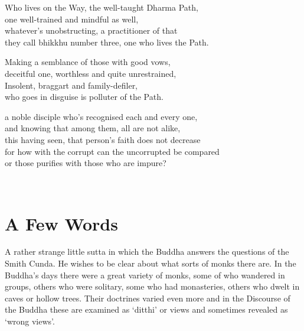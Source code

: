 \begin{MyDescription}{}
Who lives on the Way, the well-taught Dharma Path,\\
one well-trained and mindful as well,\\
whatever's unobstructing, a practitioner of that\\
they call bhikkhu number three, one who lives the Path.
\end{MyDescription}
   
\begin{MyDescription}{}
Making a semblance of those with good vows,\\
deceitful one, worthless and quite unrestrained,\\
Insolent, braggart and family-defiler,\\
who goes in disguise is polluter of the Path.
\end{MyDescription}
   
\begin{MyDescription}{}
a noble disciple who's recognised each and every one,\\
and knowing that among them, all are not alike,\\
this having seen, that person's faith does not decrease\\
for how with the corrupt can the uncorrupted be compared\\
or those purifies with those who are impure?
\end{MyDescription}
   
\begin{MyDescription}[(Sn. 83-90)]{}
\end{MyDescription}
   							
\newpage    
\section{A Few Words}
   
A rather strange little sutta in which the Buddha answers the questions of the Smith Cunda. He wishes to be clear about what sorts of monks there are. In the Buddha's days there were a great variety of monks, some of who wandered in groups, others who were solitary, some who had monasteries, others who dwelt in caves or hollow trees. Their doctrines varied even more and in the Discourse of the Buddha these are examined as `ditthi' or views and sometimes revealed as `wrong views'.
   
